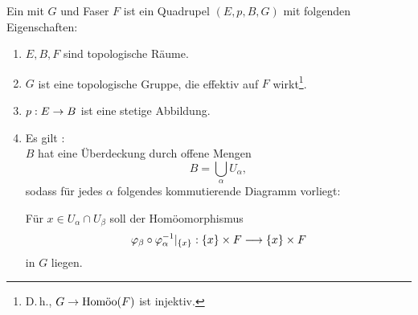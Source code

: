 \Def{}
Ein  mit  $G$ und Faser $F$ ist ein Quadrupel $(E,p,B, G)$ mit folgenden Eigenschaften:
\begin{enumerate}[1)]
	\item $E,B,F$ sind topologische Räume.
	\item $G$ ist eine topologische Gruppe, die effektiv auf $F$ wirkt\footnote{D.\,h., $G \overset{}{\rightarrow} \text{Homöo}(F)$ ist injektiv.}.
	\item $p: E \overset{}{\rightarrow} B$ ist eine stetige Abbildung.
	\item Es gilt :\\
	$B$ hat eine Überdeckung durch offene Mengen
	\[ B = \bigcup_\alpha U_\alpha, \]
	sodass für jedes $\alpha$ folgendes kommutierende Diagramm vorliegt:
	\begin{center}
	\end{center}
Für $x \in U_\alpha \cap U_\beta$ soll der Homöomorphismus
\[ \varphi_\beta \circ \varphi_\alpha^{-1} |_{\{x\}} : \{x\} \times F \overset{}{\longrightarrow}  \{x\} \times F   \]
in $G$ liegen.
	
\end{enumerate}